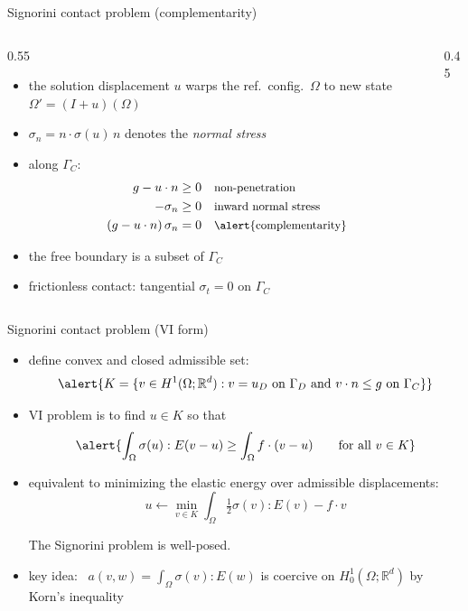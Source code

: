 \documentclass[aspectratio=169,10pt]{beamer}
\begin{document}
\begin{frame}{Signorini contact problem (complementarity)}

\begin{columns}[T]

\begin{column}{0.55\textwidth}
\begin{itemize}
\item the solution displacement $u$ warps the ref.~config.~$\Omega$ to new state $\Omega' = (I+u)(\Omega)$ \, \grey{\small $\to$}

\medskip
\item $\sigma_n=n\cdot\sigma(u)\,n$ denotes the \emph{normal stress}

\medskip
\item along $\Gamma_C$:
\begin{align*}
g - u\cdot n &\ge 0 && \text{\small non-penetration}\\
-\sigma_n &\ge 0 && \text{\small inward normal stress} \\
(g-u\cdot n) \, \sigma_n &= 0 && \text{\small \alert{complementarity}}
\end{align*}
\item the free boundary is a \alert{subset of $\Gamma_C$}
\item frictionless contact: tangential $\sigma_t=0$ on $\Gamma_C$
\end{itemize}

\bigskip
\qquad {}
\end{column}

\begin{column}{0.45\textwidth}
\hfill 
\end{column}
\end{columns}

\end{frame}


\begin{frame}{Signorini contact problem (VI form)}

\begin{itemize}
\item define convex and closed admissible set:
    $$\alert{K = \{v\in H^1(\Omega;\mathbb{R}^d) : v=u_D \text{ on } \Gamma_D \text{ and } v\cdot n\le g \text{ on } \Gamma_C\}}$$
\item VI problem is to find \alert{$u\in K$} so that
    $$\alert{\int_\Omega \sigma(u):E(v-u) \ge \int_\Omega f\cdot(v-u) \qquad\text{for all } v\in K}$$
\item equivalent to minimizing the elastic energy over admissible displacements:
    $$u \leftarrow \min_{v\in K} \int_\Omega \tfrac12\sigma(v):E(v) - f\cdot v$$

\begin{theorem}[Fichera 1963]
The Signorini problem is well-posed.
\end{theorem}

\item key idea: \, $a(v,w)=\int_\Omega \sigma(v):E(w)$ is coercive on $H_0^1(\Omega;\mathbb{R}^d)$ by Korn's inequality
\end{itemize}
\end{frame}
\end{document}

